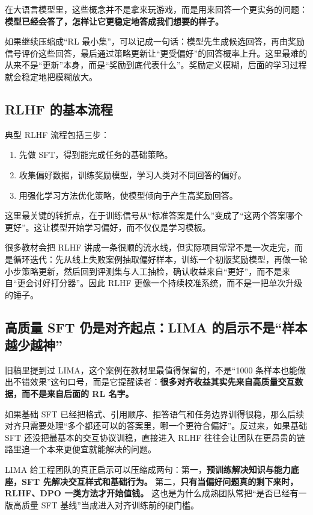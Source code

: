 在大语言模型里，这些概念并不是拿来玩游戏，而是用来回答一个更实务的问题：\textbf{模型已经会答了，怎样让它更稳定地答成我们想要的样子。}

如果继续压缩成“RL 最小集”，可以记成一句话：模型先生成候选回答，再由奖励信号评价这些回答，最后通过策略更新让“更受偏好”的回答概率上升。这里最难的从来不是“更新”本身，而是“奖励到底代表什么”。奖励定义模糊，后面的学习过程就会稳定地把模糊放大。

\subsection{RLHF 的基本流程}
典型 RLHF 流程包括三步：
\begin{enumerate}
  \item 先做 SFT，得到能完成任务的基础策略。
  \item 收集偏好数据，训练奖励模型，学习人类对不同回答的偏好。
  \item 用强化学习方法优化策略，使模型倾向于产生高奖励回答。
\end{enumerate}

这里最关键的转折点，在于训练信号从“标准答案是什么”变成了“这两个答案哪个更好”。这让模型开始学习偏好，而不仅仅是学习模板。

很多教材会把 RLHF 讲成一条很顺的流水线，但实际项目常常不是一次走完，而是循环迭代：先从线上失败案例抽取偏好样本，训练一个初版奖励模型，再做一轮小步策略更新，然后回到评测集与人工抽检，确认收益来自“更好”，而不是来自“更会讨好打分器”。因此 RLHF 更像一个持续校准系统，而不是一把单次升级的锤子。

\subsection{高质量 SFT 仍是对齐起点：LIMA 的启示不是“样本越少越神”}
旧稿里提到过 LIMA，这个案例在教材里最值得保留的，不是“1000 条样本也能做出不错效果”这句口号，而是它提醒读者：\textbf{很多对齐收益其实先来自高质量交互数据，而不是来自后面的 RL 名字。}

如果基础 SFT 已经把格式、引用顺序、拒答语气和任务边界训得很稳，那么后续对齐只需要处理“多个都还可以的答案里，哪一个更符合偏好”。反过来，如果基础 SFT 还没把最基本的交互协议训稳，直接进入 RLHF 往往会让团队在更昂贵的链路里追一个本来更便宜就能解决的问题。

LIMA 给工程团队的真正启示可以压缩成两句：第一，\textbf{预训练解决知识与能力底座，SFT 先解决交互样式和基础行为。} 第二，\textbf{只有当偏好问题真的剩下来时，RLHF、DPO 一类方法才开始值钱。} 这也是为什么成熟团队常把“是否已经有一版高质量 SFT 基线”当成进入对齐训练前的硬门槛。

